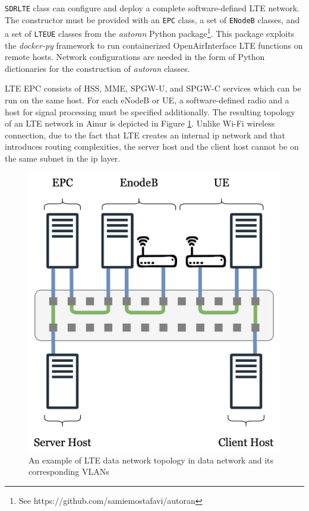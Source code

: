 \begin{description}[style=nextline]
    \item[\gls{SDR}-based \gls{LTE} Network]
    \texttt{SDRLTE} class can configure and deploy a complete software-defined \gls{LTE} network.
    The constructor must be provided with an \texttt{EPC} class, a set of \texttt{ENodeB} classes, and a set of \texttt{LTEUE} classes from the \emph{autoran} Python package\footnote{See https://github.com/samiemostafavi/autoran}.
    This package exploits the \emph{docker-py} framework to run containerized OpenAirInterface \gls{LTE} functions on remote hosts.
    Network configurations are needed in the form of Python dictionaries for the construction of \emph{autoran} classes.

    \gls{LTE} \gls{EPC} consists of HSS, MME, SPGW-U, and SPGW-C services which can be run on the same host.
    For each \gls{eNodeB} or \gls{UE}, a software-defined radio and a host for signal processing must be specified additionally.
    The resulting topology of an \gls{LTE} network in Ainur is depicted in Figure \ref{fig:lte}.
    Unlike Wi-Fi wireless connection, due to the fact that \gls{LTE} creates an internal ip network and that introduces routing complexities, the server host and the client host cannot be on the same subnet in the ip layer.
    

    \begin{figure}[t]
        \centering
        \includegraphics[width=0.8\linewidth]{figures/lte.png}
        \caption{An example of \gls{LTE} data network topology in data network and its corresponding \glspl{VLAN}}
        \label{fig:lte}
    \end{figure}




\end{description}
